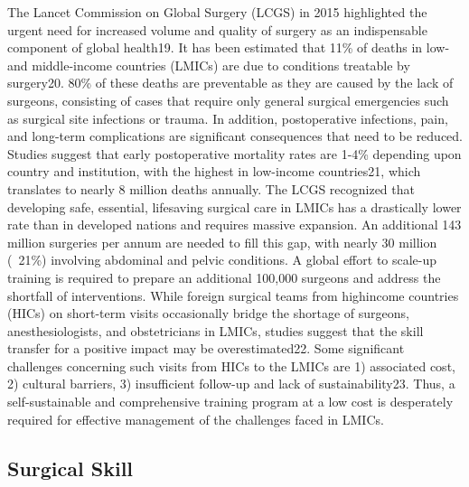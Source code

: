 The Lancet Commission on Global Surgery (LCGS) in 2015 highlighted the urgent need for increased volume and quality of surgery as an indispensable component of global health19. It has been estimated that 11\% of deaths in low- and middle-income countries (LMICs) are due to conditions treatable by surgery20. 80\% of these deaths are preventable as they are caused by the lack of surgeons, consisting of cases that require only general surgical emergencies such as surgical site infections or trauma. In addition, postoperative infections, pain, and long-term complications are significant consequences that need to be reduced. Studies suggest that early postoperative mortality rates are 1-4\% depending upon country and institution, with the highest in low-income countries21, which translates to nearly 8 million deaths annually. The LCGS recognized that developing safe, essential, lifesaving surgical care in LMICs has a drastically lower rate than in developed nations and requires massive expansion. An additional 143 million surgeries per annum are needed to fill this gap, with nearly 30 million (~21\%) involving abdominal and pelvic conditions. A global effort to scale-up training is required to prepare an additional 100,000 surgeons and address the shortfall of interventions. While foreign surgical teams from highincome countries (HICs) on short-term visits occasionally bridge the shortage of surgeons, anesthesiologists, and obstetricians in LMICs, studies suggest that the skill transfer for a positive impact may be overestimated22. Some significant challenges concerning such visits from HICs to the LMICs are 1) associated cost, 2) cultural barriers, 3) insufficient follow-up and lack of sustainability23. Thus, a self-sustainable and comprehensive training program at a low cost is desperately required for effective management of the challenges faced in LMICs.

\subsection{Surgical Skill}


